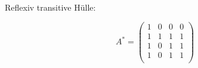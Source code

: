 \begin{itemize}
Reflexiv transitive Hülle:

\begin{equation}
	A^{\ast} =
	\left( \begin{array}{rrrr}
	1 & 0 & 0 & 0 \\
	1 & 1 & 1 & 1 \\
	1 & 0 & 1 & 1 \\
	1 & 0 & 1 & 1 \\
	\end{array}\right)
\end{equation}
\end{itemize}